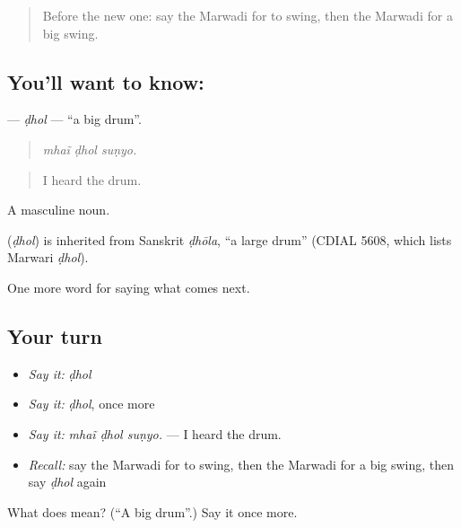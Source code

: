 \begin{quote}
Before the new one: say the Marwadi for to swing, then the Marwadi for a big swing.
\end{quote}

\subsection*{You'll want to know: }
\textbf{} — \emph{ḍhol} — \textquotedblleft{}a big drum\textquotedblright{}.

\begin{quote}
  
\end{quote}

\begin{quote}
\emph{mhaĩ ḍhol suṇyo.}
\end{quote}

\begin{quote}
I heard the drum.
\end{quote}

A masculine noun.

\begin{cousinweb}
\textbf{} (\emph{ḍhol}) is inherited from Sanskrit \emph{ḍhōla}, \textquotedblleft{}a large drum\textquotedblright{} (CDIAL 5608, which lists Marwari \emph{ḍhol}).
\end{cousinweb}

\begin{grammarlens}[title={What you've built}]
One more word for saying what comes next.
\end{grammarlens}

\subsection*{Your turn}
\begin{itemize}
\raggedright
  \item \emph{Say it:} \emph{ḍhol}
  \item \emph{Say it:} \emph{ḍhol}, once more
  \item \emph{Say it:} \emph{mhaĩ ḍhol suṇyo.} — I heard the drum.
  \item \emph{Recall:} say the Marwadi for to swing, then the Marwadi for a big swing, then say \emph{ḍhol} again
\end{itemize}

\begin{tcolorbox}[breakable,colback=teal!4,colframe=teal!35!black,title={Before you move on}]
What does  mean? (\textquotedblleft{}A big drum\textquotedblright{}.) Say it once more.
\end{tcolorbox}

